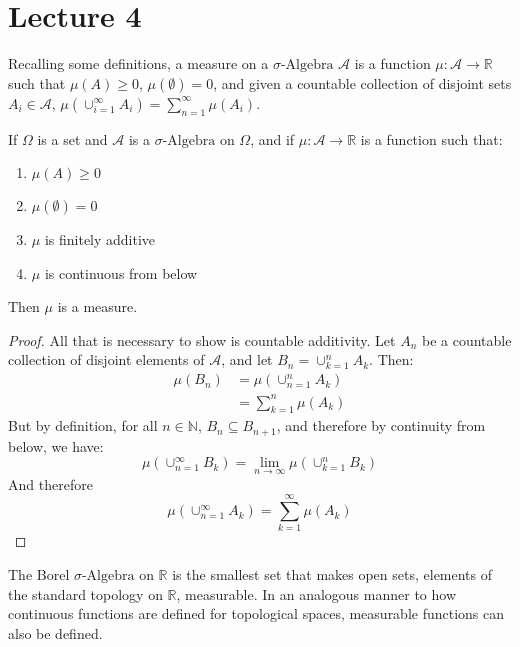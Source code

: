         \section{Lecture 4}
            Recalling some definitions, a measure on a $\sigma\textrm{-Algebra}$
            $\mathcal{A}$ is a function
            $\mu:\mathcal{A}\rightarrow\mathbb{R}$ such that
            $\mu(A)\geq{0}$, $\mu(\emptyset)=0$, and given a countable
            collection of disjoint sets $A_{i}\in\mathcal{A}$,
            $\mu(\cup_{i=1}^{\infty}A_{i})=\sum_{n=1}^{\infty}\mu(A_{i})$.
            \begin{theorem}
                If $\Omega$ is a set and $\mathcal{A}$ is a
                $\sigma\text{-Algebra}$ on $\Omega$, and if
                $\mu:\mathcal{A}\rightarrow\mathbb{R}$ is a function such that:
                \begin{enumerate}
                    \item $\mu(A)\geq{0}$
                    \item $\mu(\emptyset)=0$
                    \item $\mu$ is finitely additive
                    \item $\mu$ is continuous from below
                \end{enumerate}
                Then $\mu$ is a measure.
            \end{theorem}
            \begin{proof}
                All that is necessary to show is countable additivity.
                Let $A_{n}$ be a countable collection of disjoint elements
                of $\mathcal{A}$, and let $B_{n}=\cup_{k=1}^{n}A_{k}$.
                Then:
                \begin{align}
                    \mu(B_{n})&=\mu(\cup_{n=1}^{n}A_{k})\\
                    &=\sum_{k=1}^{n}\mu(A_{k})
                \end{align}
                But by definition, for all $n\in\mathbb{N}$,
                $B_{n}\subseteq{B_{n+1}}$, and therefore by continuity from
                below, we have:
                \begin{equation}
                    \mu(\cup_{n=1}^{\infty}B_{k})
                    =\lim_{n\rightarrow\infty}\mu(\cup_{k=1}^{n}B_{k})
                \end{equation}
                And therefore
                \begin{equation}
                    \mu(\cup_{n=1}^{\infty}A_{k})=
                    \sum_{k=1}^{\infty}\mu(A_{k})
                \end{equation}
            \end{proof}
                The Borel $\sigma\text{-Algebra}$ on $\mathbb{R}$ is the
                smallest set that makes open sets, elements of the standard
                topology on $\mathbb{R}$, measurable. In an analogous manner
                to how continuous functions are defined for topological
                spaces, measurable functions can also be defined.
